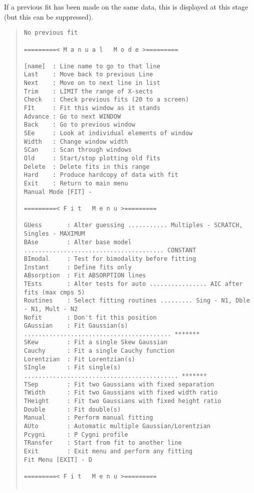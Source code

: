 If a previous fit has been made on the same data, this is displayed
at this stage (but this can be suppressed).
\begin{quote}\begin{verbatim}
No previous fit

=========< M a n u a l   M o d e >=========

[name]  : Line name to go to that line
Last    : Move back to previous Line
Next    : Move on to next line in list
Trim    : LIMIT the range of X-sects
Check   : Check previous fits (20 to a screen)
FIt     : Fit this window as it stands
Advance : Go to next WINDOW
Back    : Go to previous window
SEe     : Look at individual elements of window
Width   : Change window width
SCan    : Scan through windows
Old     : Start/stop plotting old fits
Delete  : Delete fits in this range
Hard    : Produce hardcopy of data with fit
Exit    : Return to main menu
Manual Mode [FIT] -

=========< F i t   M e n u >=========

GUess       : Alter guessing ........... Multiples - SCRATCH, Singles - MAXIMUM
BAse        : Alter base model ....................................... CONSTANT
BImodal     : Test for bimodality before fitting
Instant     : Define fits only
ABsorption  : Fit ABSORPTION lines
TEsts       : Alter tests for auto ................ AIC after fits (max cmps 5)
Routines    : Select fitting routines ......... Sing - N1, Dble - N1, Mult - N2
Nofit       : Don't fit this position
GAussian    : Fit Gaussian(s) ......................................... *******
SKew        : Fit a single Skew Gaussian
Cauchy      : Fit a single Cauchy function
Lorentzian  : Fit Lorentzian(s)
SIngle      : Fit single(s) ........................................... *******
TSep        : Fit two Gaussians with fixed separation
TWidth      : Fit two Gaussians with fixed width ratio
THeight     : Fit two Gaussians with fixed height ratio
Double      : Fit double(s)
Manual      : Perform manual fitting
AUto        : Automatic multiple Gaussian/Lorentzian
Pcygni      : P Cygni profile
TRansfer    : Start from fit to another line
Exit        : Exit menu and perform any fitting
Fit Menu [EXIT] - D

=========< F i t   M e n u >=========


\end{verbatim}
\end{quote}
